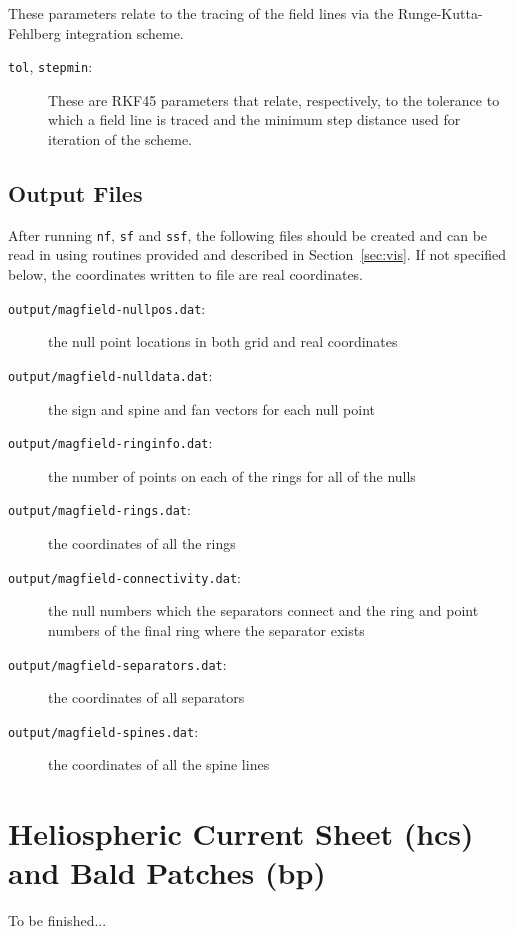 \documentclass[12pt]{article}
\begin{document}
        These parameters relate to the tracing of the field lines via the Runge-Kutta-Fehlberg integration scheme.
        \begin{description}
          \item [\texttt{tol}, \texttt{stepmin}:] These are RKF45 parameters that relate, respectively, to the tolerance to which a field line is traced and the minimum step distance used for iteration of the scheme.
        \end{description}

    \subsection{Output Files}

      After running \texttt{nf}, \texttt{sf} and \texttt{ssf}, the following files should be created and can be read in using routines provided and described in Section~\ref{sec:vis}. If not specified below, the coordinates written to file are real coordinates.
      \begin{description}
        \item [\texttt{output/magfield-nullpos.dat}:] the null point locations in both grid and real coordinates
        \item [\texttt{output/magfield-nulldata.dat}:] the sign and spine and fan vectors for each null point
        \item [\texttt{output/magfield-ringinfo.dat}:] the number of points on each of the rings for all of the nulls
        \item [\texttt{output/magfield-rings.dat}:] the coordinates of all the rings
        \item [\texttt{output/magfield-connectivity.dat}:] the null numbers which the separators connect and the ring and point numbers of the final ring where the separator exists
        \item [\texttt{output/magfield-separators.dat}:] the coordinates of all separators
        \item [\texttt{output/magfield-spines.dat}:] the coordinates of all the spine lines
      \end{description}

  \section{Heliospheric Current Sheet (hcs) and Bald Patches (bp)}

    To be finished...
\end{document}
